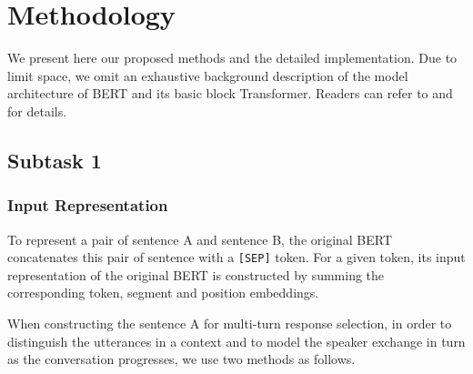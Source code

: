 \documentclass[letterpaper]{article} \usepackage{aaai20}  \usepackage{times}  \usepackage{helvet} \usepackage{courier}  \usepackage[hyphens]{url}  \usepackage{graphicx} \urlstyle{rm} \def\UrlFont{\rm}  \usepackage{graphicx}  \frenchspacing  \setlength{\pdfpagewidth}{8.5in}  \setlength{\pdfpageheight}{11in}
\begin{document}
\section{Methodology}

  We present here our proposed methods and the detailed implementation.
  Due to limit space, we omit an exhaustive background description of the model architecture of BERT and its basic block Transformer.
  Readers can refer to \cite{DBLP:conf/naacl/DevlinCLT19} and \cite{DBLP:conf/nips/VaswaniSPUJGKP17} for details.

  \subsection{Subtask 1}

  \subsubsection{Input Representation}

    To represent a pair of sentence A and sentence B, the original BERT concatenates this pair of sentence with a \texttt{[SEP]} token.
    For a given token, its input representation of the original BERT is constructed by summing the corresponding token, segment and position embeddings.

    When constructing the sentence A for multi-turn response selection, in order to distinguish the utterances in a context and to model the speaker exchange in turn as the conversation progresses, we use two methods as follows.
\end{document}
